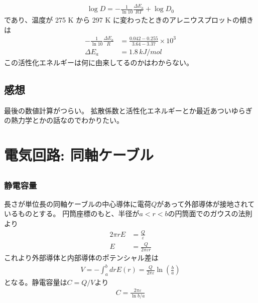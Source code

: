 \documentclass[../../master.tex]{subfiles}
\begin{document}
\subsection{}
\begin{align}
    \log D = -\frac{1}{\ln 10}\frac{\Delta E_a}{RT} + \log D_0
\end{align}
であり、温度が 275 K から 297 K に変わったときのアレニウスプロットの傾きは
\begin{align}
    -\frac{1}{\ln10}\frac{\Delta E_a}{ R} &= \frac{0.042-0.255}{3.64-3.37}\times 10^3\\
    \Delta E_a &= 1.8 \,\si{kJ/mol}
\end{align}
この活性化エネルギーは何に由来してるのかはわからない。

\subsection*{感想}
最後の数値計算がつらい。
拡散係数と活性化エネルギーとか最近あついゆらぎの熱力学とかの話なのでわかりたい。


\clearpage
\section{電気回路: 同軸ケーブル}
\subsection{}
\subsubsection{静電容量}
長さが単位長の同軸ケーブルの中心導体に電荷\(Q\)があって外部導体が接地されているものとする。
円筒座標のもと、半径が\(a<r<b\)の円筒面でのガウスの法則より
\begin{align}
    2\pi r E &= \frac{Q}{\varepsilon}\\
    E &= \frac{Q}{2\pi \varepsilon r}
\end{align}
これより外部導体と内部導体のポテンシャル差は
\begin{align}
    V = -\int_a^b dr E(r) = \frac{Q}{2\pi\varepsilon}\ln(\frac{b}{a})
\end{align}
となる。静電容量は\(C = Q/V\)より
\begin{align}
    C = \frac{2\pi \varepsilon}{\ln b/a}
\end{align}
\end{document}
